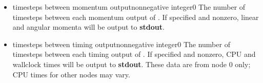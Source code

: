 \begin{itemize}
\item
{}%
{timesteps between momentum output}{nonnegative integer}{0}%
{%
The number of timesteps between each momentum output of \NAMD.
If specified and nonzero, linear and angular momenta will be
output to {\bf stdout}.
}

\item
{}%
{timesteps between timing output}{nonnegative integer}{0}%
{%
The number of timesteps between each timing output of \NAMD.
If specified and nonzero, CPU and wallclock times will be
output to {\bf stdout}.
These data are from node 0 only; CPU times for other nodes
may vary.
}

\end{itemize}

